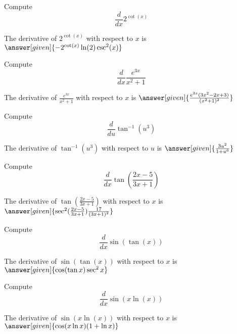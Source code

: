 \documentclass{ximera}
\begin{document}
\begin{question} %
  Compute
  \[
  \frac{d}{dx} 2^{\cot(x)}
  \]
  
    
    
		The derivative of $2^{\cot(x)}$ with respect to $x$ is
		 $\answer[given]{-2^{\cot(x)}\ln(2)\csc^2(x)}$
		
\end{question}



\begin{question} %
  Compute
  \[
  \frac{d}{dx} \frac{e^{3x}}{x^2 + 1}
  \]
  
    
		The derivative of $\frac{e^{3x}}{x^2 + 1}$ with respect to $x$ is
		 $\answer[given]{\frac{e^{3x}(3x^2 -2x +3)}{(x^2 + 1)^2}}$
		
\end{question}


\begin{question} %
  Compute
  \[
  \frac{d}{du} \tan^{-1}(u^3)
  \]
  
    
		The derivative of $\tan^{-1}(u^3)$ with respect to $u$ is
		 $\answer[given]{\frac{3u^2}{1+u^6}}$
		
\end{question}




\begin{question} %
  Compute
  \[
  \frac{d}{dx} \tan\left(\frac{2x-5}{3x+1}\right)
  \]
  
   
		The derivative of $\tan\left(\frac{2x-5}{3x+1}\right)$ with respect to $x$ is
		 $\answer[given]{\sec^2(\frac{2x-5}{3x+1})\frac{17}{(3x+1)^2}}$
		
\end{question}


\begin{question} %
  Compute
  \[
  \frac{d}{dx} \sin(\tan (x))
  \]
  
    
		The derivative of $\sin(\tan (x))$ with respect to $x$ is
		 $\answer[given]{\cos(\tan x)\sec^2 x}$
		
\end{question}

\begin{question} %
  Compute
  \[
  \frac{d}{dx} \sin(x\ln (x))
  \]
  
    
		The derivative of $\sin(x\ln (x))$ with respect to $x$ is
		 $\answer[given]{\cos(x\ln x)(1+\ln x)}$
		
\end{question}
\end{document}
